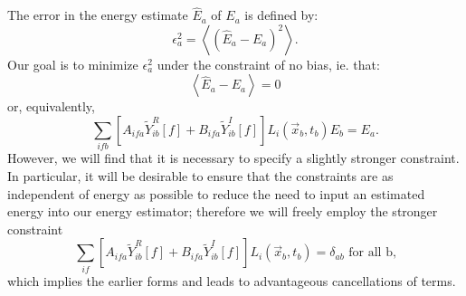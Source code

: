 The error in the energy estimate $\widehat{E}_a$ of $E_a$ is defined by:
\begin{equation}
\epsilon^2_a = \left< \left(\widehat{E}_a - E_a\right)^2\right>.
\end{equation}
Our goal is to minimize $\epsilon^2_a$ under the constraint of no bias, ie. that:
\begin{equation}\label{eqn:ConstraintForm1}
\left<\widehat{E}_a - E_a\right> = 0
\end{equation}
or, equivalently,
\begin{equation}
\sum_{ifb}\left[A_{ifa} \widetilde{Y}_{ib}^R[f] + B_{ifa} \widetilde{Y}_{ib}^I[f]\right] L_i(\vec{x}_b,t_b) E_b = E_a.
\end{equation}
However, we will find that it is necessary to specify a slightly stronger constraint.  In particular, it will be desirable to ensure that the constraints are as independent of energy as possible to reduce the need to input an estimated energy into our energy estimator; therefore we will freely employ the stronger constraint
\begin{equation}
\sum_{if}\left[A_{ifa} \widetilde{Y}_{ib}^R[f] + B_{ifa} \widetilde{Y}_{ib}^I[f]\right] L_i(\vec{x}_b,t_b) = \delta_{ab} \text{~for all b,} \label{eqn:ConstraintForm3}
\end{equation}
which implies the earlier forms and leads to advantageous cancellations of terms.

